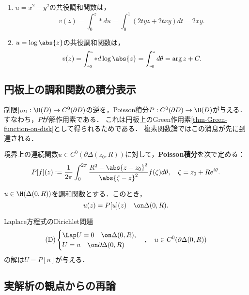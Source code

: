 \documentclass[uplatex,dvipdfmx]{jsreport}
\begin{document}
\begin{example}\mbox{}
    \begin{enumerate}
        \item $u=x^2-y^2$の共役調和関数は，
        \[v(z)=\int^z_0*du=\int^1_0(2tyz+2txy)dt=2xy.\]
        \item $u=\log\abs{z}$の共役調和関数は，
        \[v(z)=\int^z_{z_0}*d\log\abs{z}=\int^z_{z_0}d\theta=\arg z+C.\]
    \end{enumerate}
\end{example}

\subsection{円板上の調和関数の積分表示}

\begin{tcolorbox}[colframe=ForestGreen, colback=ForestGreen!10!white,breakable,colbacktitle=ForestGreen!40!white,coltitle=black,fonttitle=\bfseries\sffamily,
title=]
    制限$|_{\partial D}:\H(D)\to C^0(\partial D)$の逆を，Poisson積分$P:C^0(\partial D)\to\H(D)$が与える．
    すなわち，$P$が解作用素である．
    これは円板上のGreen作用素\ref{thm-Green-function-on-disk}として得られるためである．
    複素関数論ではこの消息が先に到達される．
\end{tcolorbox}

\begin{definition}
    境界上の連続関数$u\in C^0(\partial\Delta(z_0,R))$に対して，\textbf{Poisson積分}を次で定める：
    \[P[f](z):=\frac{1}{2\pi}\int^{2\pi}_0\frac{R^2-\abs{z-z_0}^2}{\abs{\zeta-z}^2}f(\zeta)d\theta,\quad\zeta=z_0+Re^{i\theta}.\]
\end{definition}

\begin{theorem}
    $u\in\H(\Delta(0,R))$を調和関数とする．このとき，
    \[u(z)=P[u](z)\quad\on\Delta(0,R).\]
\end{theorem}

\begin{theorem}
    Laplace方程式のDirichlet問題
    \[\mathrm{(D)}\begin{cases}
        \Lap U=0\quad\on\Delta(0,R),\\
        U=u\quad\on\partial\Delta(0,R)
    \end{cases},\quad u\in C^0(\partial\Delta(0,R))\]
    の解は$U=P[u]$が与える．
\end{theorem}

\subsection{実解析の観点からの再論}
\end{document}
